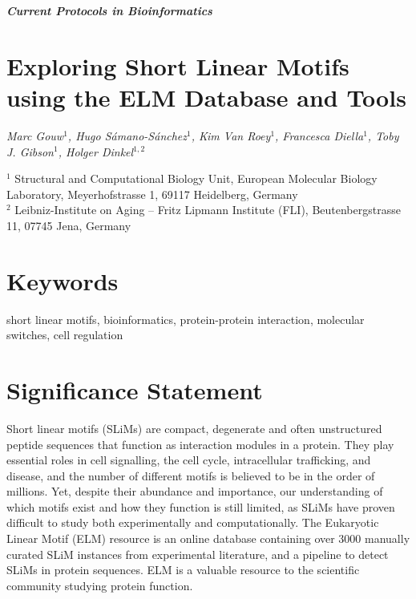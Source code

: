 \documentclass[12pt]{article}
\begin{document}

\thispagestyle{plain}
\begin{center}

\textbf{\LARGE \textit{Current Protocols in Bioinformatics}}\\\vspace{2mm}
\end{center}

\section*{Exploring Short Linear Motifs using the ELM Database and Tools}

{\small \it
Marc Gouw$^{1}$,
Hugo S\'{a}mano-S\'{a}nchez$^{1}$,
Kim Van Roey$^{1}$,
Francesca Diella$^{1}$,
Toby J. Gibson$^{1}$,
Holger Dinkel$^{1,2}$

$^{1}$ Structural and Computational Biology Unit, European Molecular Biology
Laboratory, Meyerhofstrasse 1, 69117 Heidelberg, Germany\\
$^{2}$ Leibniz-Institute on Aging -- Fritz Lipmann Institute (FLI),
Beutenbergstrasse 11, 07745 Jena, Germany
}

\section*{Keywords}

short linear motifs, bioinformatics, protein-protein interaction, molecular
switches, cell regulation

\section*{Significance Statement}

Short linear motifs (SLiMs) are compact, degenerate and often unstructured
peptide sequences that function as interaction modules in a protein. They play
essential roles in cell signalling, the cell cycle, intracellular trafficking,
and disease, and the number of different motifs is believed to be in the order
of millions. Yet, despite their abundance and importance, our understanding of
which motifs exist and how they function is still limited, as SLiMs have proven
difficult to study both experimentally and computationally. The Eukaryotic
Linear Motif (ELM) resource is an online database containing over 3000 manually
curated SLiM instances from experimental literature, and a pipeline to detect
SLiMs in protein sequences. ELM is a valuable resource to the scientific
community studying protein function.
\end{document}
